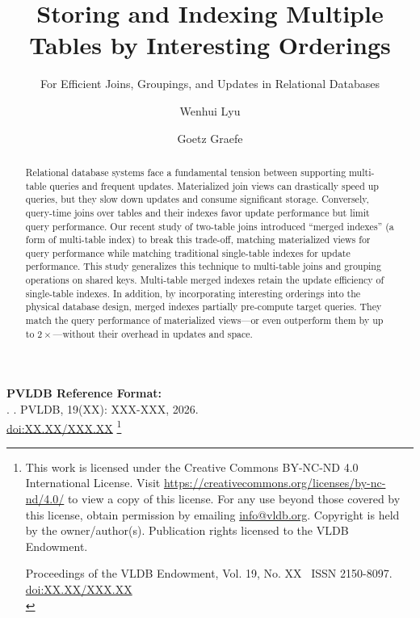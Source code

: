 \documentclass[sigconf, pdfa, nonacm]{acmart}
\newcommand\vldbdoi{XX.XX/XXX.XX}
\newcommand\vldbpages{XXX-XXX}
\newcommand\vldbvolume{19}
\newcommand\vldbissue{XX}
\newcommand\vldbyear{2026}
\newcommand\vldbauthors{\authors}
\newcommand\vldbtitle{\shorttitle}
\newcommand\vldbpagestyle{plain}
\begin{document}
\title{Storing and Indexing Multiple Tables by Interesting Orderings}
\subtitle{For Efficient Joins, Groupings, and Updates in Relational Databases}

\author{Wenhui Lyu} 
 

\author{Goetz Graefe} 
 


\begin{abstract}
Relational database systems face a fundamental tension between supporting multi-table queries and frequent updates. Materialized join views can drastically speed up queries, but they slow down updates and consume significant storage. Conversely, query-time joins over tables and their indexes favor update performance but limit query performance. Our recent study of two-table joins introduced ``merged indexes'' (a form of multi-table index) to break this trade-off, matching materialized views for query performance while matching traditional single-table indexes for update performance. This study generalizes this technique to multi-table joins and grouping operations on shared keys. Multi-table merged indexes retain the update efficiency of single-table indexes. In addition, by incorporating interesting orderings into the physical database design, merged indexes partially pre-compute target queries. They match the query performance of materialized views---or even outperform them by up to \(2\times\)---without their overhead in updates and space. %
\end{abstract}

\maketitle

\pagestyle{\vldbpagestyle}
\begingroup\small\noindent\raggedright\textbf{PVLDB Reference Format:}\\
\vldbauthors. \vldbtitle. PVLDB, \vldbvolume(\vldbissue): \vldbpages, \vldbyear.\\
\href{https://doi.org/\vldbdoi}{doi:\vldbdoi}
\endgroup
\begingroup
\renewcommand\thefootnote{}\footnote{\noindent
This work is licensed under the Creative Commons BY-NC-ND 4.0 International License. Visit \url{https://creativecommons.org/licenses/by-nc-nd/4.0/} to view a copy of this license. For any use beyond those covered by this license, obtain permission by emailing \href{mailto:info@vldb.org}{info@vldb.org}. Copyright is held by the owner/author(s). Publication rights licensed to the VLDB Endowment. \\
\raggedright Proceedings of the VLDB Endowment, Vol. \vldbvolume, No. \vldbissue\ %
ISSN 2150-8097. \\
\href{https://doi.org/\vldbdoi}{doi:\vldbdoi} \\
}\addtocounter{footnote}{-1}\endgroup
\end{document}
